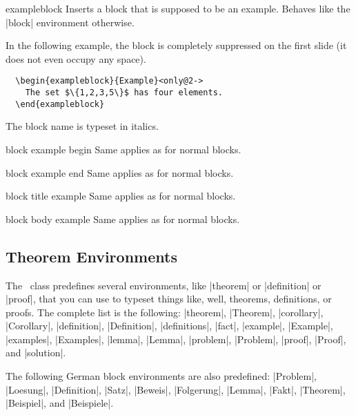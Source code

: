 \begin{environment}{{exampleblock}}
  Inserts a block that is supposed to be an example. Behaves like the |block| environment otherwise.

  \example
  In the following example, the block is completely suppressed on the first slide (it does not even occupy any space).
\begin{verbatim}
  \begin{exampleblock}{Example}<only@2->
    The set $\{1,2,3,5\}$ has four elements.
  \end{exampleblock}
\end{verbatim}

  \articlenote
  The block name is typeset in italics.

  \begin{element}{block example begin}\yes\no\no
    Same applies as for normal blocks.
  \end{element}

  \begin{element}{block example end}\yes\no\no
    Same applies as for normal blocks.
  \end{element}

  \begin{element}{block title example}\no\yes\yes
    Same applies as for normal blocks.
  \end{element}

  \begin{element}{block body example}\no\yes\yes
    Same applies as for normal blocks.
  \end{element}
\end{environment}


\subsection{Theorem Environments}
\label{section-theorems}

The \beamer\ class predefines several environments, like |theorem| or |definition| or |proof|, that you can use to typeset things like, well, theorems, definitions, or proofs. The complete list is the following: 
|theorem|, |Theorem|, |corollary|, |Corollary|, |definition|, |Definition|, |definitions|, |fact|, |example|, |Example|, |examples|, |Examples|, |lemma|, |Lemma|, |problem|, |Problem|, |proof|, |Proof|, and |solution|.

The following German block environments are also predefined: |Problem|, |Loesung|, |Definition|, |Satz|, |Beweis|, |Folgerung|, |Lemma|, |Fakt|, |Theorem|, |Beispiel|, and |Beispiele|.

